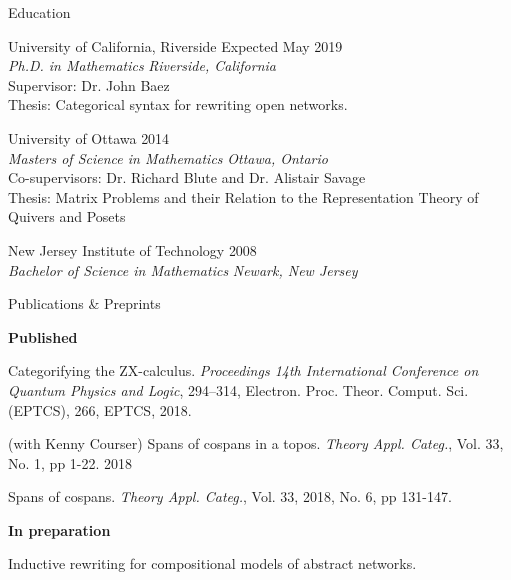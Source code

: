 \documentclass{Resume} %
\begin{document}

\begin{rSection}{Education}

{\sc University of California, Riverside} 
\hfill 
{Expected May 2019} \\ 
\textit{Ph.D. in Mathematics} 
\hfill 
{\em Riverside, California} \\
Supervisor: Dr. John Baez \\
Thesis: Categorical syntax for rewriting open networks.

{\sc University of Ottawa} 
\hfill 
{2014} \\ 
\textit{Masters of Science in Mathematics}
\hfill
{\em Ottawa, Ontario} \\
Co-supervisors: Dr. Richard Blute and Dr. Alistair Savage \\
Thesis: {Matrix Problems and their Relation to the Representation Theory of Quivers and Posets }

{\sc New Jersey Institute of Technology} 
\hfill 
{2008} \\ 
\textit{Bachelor of Science in Mathematics} 
\hfill
{\em Newark, New Jersey}

\end{rSection}






\begin{rSection}{Publications \& Preprints}

  \textbf{Published}
  
  Categorifying the ZX-calculus.  \emph{Proceedings 14th International
    Conference on Quantum Physics and Logic}, 294--314,
  Electron. Proc. Theor. Comput. Sci. (EPTCS), 266, EPTCS, 2018.
  
  (with Kenny Courser) Spans of cospans in a topos. \emph{Theory
    Appl. Categ.}, Vol. 33, No. 1, pp 1-22. 2018
	
  Spans of cospans.  \emph{Theory Appl. Categ.}, Vol. 33, 2018, No. 6,
  pp 131-147.

  \textbf{In preparation}
  
  Inductive rewriting for compositional models of abstract
  networks.
  
\end{rSection}
\end{document}

